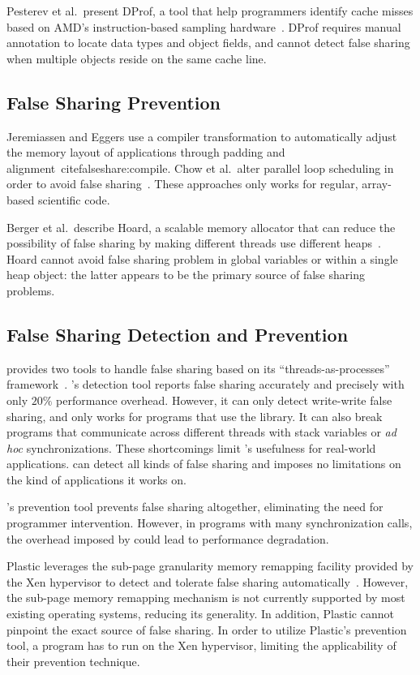 Pesterev et al.\ present DProf, a tool that help programmers identify cache misses based on AMD's instruction-based sampling hardware~\cite{DProf}. DProf requires manual annotation to locate data types and object fields, and cannot detect false sharing when multiple objects reside on the same cache line.

\subsection{False Sharing Prevention}

Jeremiassen and Eggers use a compiler transformation to automatically adjust the memory layout of applications through padding and alignment~cite{falseshare:compile}. Chow et al.\ alter parallel loop scheduling in order to avoid false
sharing~\cite{falseshare:schedule}. These approaches only works for regular, array-based scientific code.

Berger et al.\ describe Hoard, a scalable memory allocator that can reduce the possibility of false sharing by making different threads use different heaps~\cite{Hoard}. Hoard cannot avoid false sharing problem in global variables or within a single heap object: the latter appears to be the primary source of false sharing problems.

\subsection{False Sharing Detection and Prevention}

\sheriff{} provides two tools to handle false sharing based on its ``threads-as-processes'' framework~\cite{sheriff}.
\Sheriff{}'s detection tool reports false sharing accurately and precisely with only $20\%$ performance overhead.
However, it can only detect write-write false sharing, and only works for programs that use the \pthreads{} library. It can also break programs that communicate across different threads with stack variables or \emph{ad hoc} synchronizations. These shortcomings limit \Sheriff{}'s usefulness for real-world applications.  
\Predator{} can detect all kinds of false sharing and imposes no limitations on the kind of applications it works on. 

\Sheriff{}'s prevention tool prevents false sharing altogether, eliminating the need for programmer intervention. However, in programs with many synchronization calls, the overhead imposed by \Sheriff{} could lead to performance degradation.

Plastic leverages the sub-page granularity memory remapping facility provided by the Xen hypervisor to detect and tolerate false sharing automatically~\cite{OSdetection}. However, the sub-page memory remapping mechanism is not currently supported by most existing operating systems, reducing its generality. In addition, Plastic cannot pinpoint the exact source of false sharing.  
In order to utilize Plastic's prevention tool, a program has to run on the Xen hypervisor, limiting the applicability of their prevention technique.
